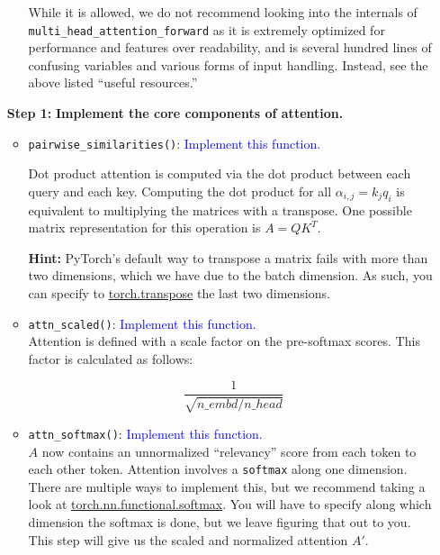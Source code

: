 \documentclass{article}
\begin{document}
\begin{enumerate}
\begin{itemize}
        While it is allowed, we do not recommend looking into the internals of
        \verb|multi_head_attention_forward| as it is extremely optimized for
        performance and features over readability, and is several hundred lines
        of confusing variables and various forms of input handling. Instead, see
        the above listed ``useful resources.''


       \end{itemize}

        
        \item[\textbf{Step 1:}]
        \textbf{Implement the core components of attention.}

        \begin{itemize}
        
        \item \verb|pairwise_similarities()|: \textcolor{blue}{Implement this
        function.}
        
        Dot product attention is computed via the dot product between each query
        and each key. Computing the dot product for all $\alpha_{i,j} = k_j q_i$
        is equivalent to multiplying the matrices with a transpose. One possible
        matrix representation for this operation is $A = Q K^T$.
        
        \textbf{Hint:} PyTorch's default way to transpose a matrix fails with
        more than two dimensions, which we have due to the batch dimension. As
        such, you can specify to
        \href{https://pytorch.org/docs/stable/generated/torch.transpose}{torch.transpose}
        the last two dimensions. 


        \item \verb|attn_scaled()|: \textcolor{blue}{Implement this function.}
        \\
        Attention is defined with a scale factor on the pre-softmax scores. This
        factor is calculated as follows:
        
        $$\frac {1}{\sqrt{n\_embd / n\_head}}$$

        \item \verb|attn_softmax()|: \textcolor{blue}{Implement this function.}
        \\
        $A$ now contains an unnormalized ``relevancy'' score from each token to
        each other token. Attention involves a \verb|softmax| along one
        dimension. There are multiple ways to implement this, but we recommend
        taking a look at
        \href{https://pytorch.org/docs/stable/generated/torch.nn.functional.softmax}{torch.nn.functional.softmax}.
        You will have to specify along which dimension the softmax is done, but
        we leave figuring that out to you. This step will give us the scaled and
        normalized attention $A'$.


\end{itemize}
\end{enumerate}
\end{document}

